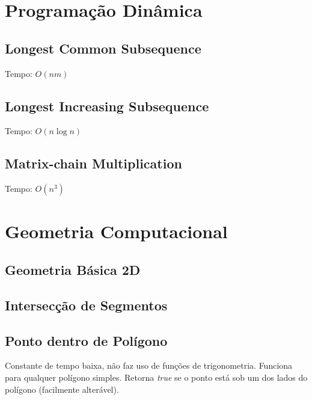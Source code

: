 \documentclass[12pt,a4paper]{article}
\begin{document}
	\section{Programação Dinâmica}
		\subsection{Longest Common Subsequence}
			Tempo: \( O(nm) \)
			
		\subsection{Longest Increasing Subsequence}
			Tempo: \( O(n \log n) \)
			
		\subsection{Matrix-chain Multiplication}
			Tempo: \( O(n^3) \)
			
	\section{Geometria Computacional}
		
		\subsection{Geometria Básica 2D}
			
		\subsection{Intersecção de Segmentos}
			
		\subsection{Ponto dentro de Polígono}
			Constante de tempo baixa, não faz uso de funções de trigonometria. Funciona para qualquer polígono simples. Retorna \emph{true} se o ponto está sob um dos lados do polígono (facilmente alterável).
			
\end{document}
